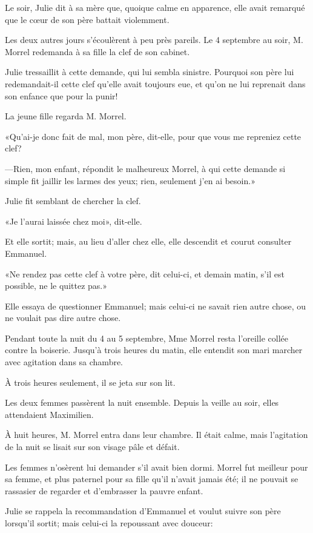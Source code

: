 Le soir, Julie dit à sa mère que, quoique calme en apparence, elle avait remarqué que le cœur de son père battait violemment.

Les deux autres jours s'écoulèrent à peu près pareils. Le 4 septembre au soir, M. Morrel redemanda à sa fille la clef de son cabinet.

Julie tressaillit à cette demande, qui lui sembla sinistre. Pourquoi son père lui redemandait-il cette clef qu'elle avait toujours eue, et qu'on ne lui reprenait dans son enfance que pour la punir!

La jeune fille regarda M. Morrel.

«Qu'ai-je donc fait de mal, mon père, dit-elle, pour que vous me repreniez cette clef?

—Rien, mon enfant, répondit le malheureux Morrel, à qui cette demande si simple fit jaillir les larmes des yeux; rien, seulement j'en ai besoin.»

Julie fit semblant de chercher la clef.

«Je l'aurai laissée chez moi», dit-elle.

Et elle sortit; mais, au lieu d'aller chez elle, elle descendit et courut consulter Emmanuel.

«Ne rendez pas cette clef à votre père, dit celui-ci, et demain matin, s'il est possible, ne le quittez pas.»

Elle essaya de questionner Emmanuel; mais celui-ci ne savait rien autre chose, ou ne voulait pas dire autre chose.

Pendant toute la nuit du 4 au 5 septembre, Mme Morrel resta l'oreille collée contre la boiserie. Jusqu'à trois heures du matin, elle entendit son mari marcher avec agitation dans sa chambre.

À trois heures seulement, il se jeta sur son lit.

Les deux femmes passèrent la nuit ensemble. Depuis la veille au soir, elles attendaient Maximilien.

À huit heures, M. Morrel entra dans leur chambre. Il était calme, mais l'agitation de la nuit se lisait sur son visage pâle et défait.

Les femmes n'osèrent lui demander s'il avait bien dormi. Morrel fut meilleur pour sa femme, et plus paternel pour sa fille qu'il n'avait jamais été; il ne pouvait se rassasier de regarder et d'embrasser la pauvre enfant.

Julie se rappela la recommandation d'Emmanuel et voulut suivre son père lorsqu'il sortit; mais celui-ci la repoussant avec douceur:

